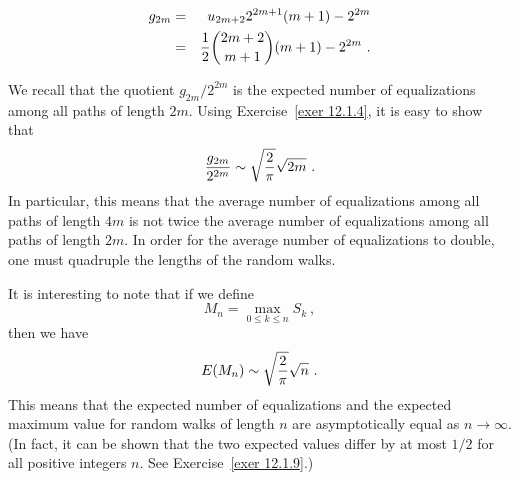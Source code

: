 \begin{example}
\begin{eqnarray*}
g_{2m} &=& u_{2m+2}2^{2m+1}(m+1) - 2^{2m}\\
       &=& {1\over 2}{{2m+2} \choose {m+1}} (m+1)  - 2^{2m}\ .
\end{eqnarray*}

We recall that the quotient $g_{2m}/2^{2m}$ is the expected number of equalizations among all
paths of length $2m$.  Using Exercise~\ref{exer 12.1.4}, it is easy to show that
$${{g_{2m}}\over{2^{2m}}} \sim \sqrt{2\over \pi}\sqrt {2m}\ .$$
In particular, this means that the average number of equalizations among all paths of length
$4m$ is not twice the average number of equalizations among all paths of length $2m$.  In order
for the average number of equalizations to double, one must quadruple the lengths of the random
walks.
\end{example}
It is interesting to note that if we define
$$M_n = \max_{0 \le k \le n} S_k\ ,$$
then we have
$$E(M_n) \sim \sqrt{2\over \pi}\sqrt n\ .$$
This means that the expected number of equalizations and the expected maximum value for random
walks of length $n$ are asymptotically equal as $n \rightarrow \infty$.  (In fact, it can be
shown that the two expected values differ by at most $1/2$ for all positive integers $n$.  See
Exercise~\ref{exer 12.1.9}.)

